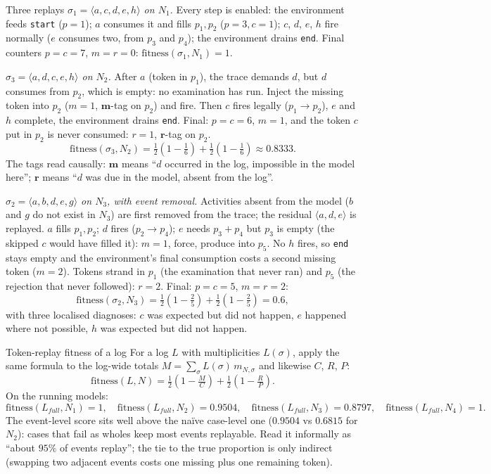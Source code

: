 \begin{examplebox}{Three replays}
\emph{$\sigma_1 = \langle a,c,d,e,h \rangle$ on $N_1$.} Every step is enabled: the environment feeds \texttt{start} ($p{=}1$); $a$ consumes it and fills $p_1, p_2$ ($p{=}3, c{=}1$); $c$, $d$, $e$, $h$ fire normally ($e$ consumes two, from $p_3$ and $p_4$); the environment drains \texttt{end}. Final counters $p = c = 7$, $m = r = 0$: $\text{fitness}(\sigma_1, N_1) = 1$.
\par\smallskip
\emph{$\sigma_3 = \langle a,d,c,e,h \rangle$ on $N_2$.} After $a$ (token in $p_1$), the trace demands $d$, but $d$ consumes from $p_2$, which is empty: no examination has run. Inject the missing token into $p_2$ ($m{=}1$, $\mathbf{m}$-tag on $p_2$) and fire. Then $c$ fires legally ($p_1 \to p_2$), $e$ and $h$ complete, the environment drains \texttt{end}. Final: $p = c = 6$, $m = 1$, and the token $c$ put in $p_2$ is never consumed: $r = 1$, $\mathbf{r}$-tag on $p_2$.
\[\text{fitness}(\sigma_3, N_2) = \tfrac{1}{2}\!\left(1 - \tfrac{1}{6}\right) + \tfrac{1}{2}\!\left(1 - \tfrac{1}{6}\right) \approx 0.8333.\]
The tags read causally: $\mathbf{m}$ means ``$d$ occurred in the log, impossible in the model here''; $\mathbf{r}$ means ``$d$ was due in the model, absent from the log''.
\par\smallskip
\emph{$\sigma_2 = \langle a,b,d,e,g \rangle$ on $N_3$, with event removal.} Activities absent from the model ($b$ and $g$ do not exist in $N_3$) are first removed from the trace; the residual $\langle a,d,e \rangle$ is replayed. $a$ fills $p_1, p_2$; $d$ fires ($p_2 \to p_4$); $e$ needs $p_3 + p_4$ but $p_3$ is empty (the skipped $c$ would have filled it): $m{=}1$, force, produce into $p_5$. No $h$ fires, so \texttt{end} stays empty and the environment's final consumption costs a second missing token ($m{=}2$). Tokens strand in $p_1$ (the examination that never ran) and $p_5$ (the rejection that never followed): $r = 2$. Final: $p = c = 5$, $m = r = 2$:
\[\text{fitness}(\sigma_2, N_3) = \tfrac{1}{2}\!\left(1 - \tfrac{2}{5}\right) + \tfrac{1}{2}\!\left(1 - \tfrac{2}{5}\right) = 0.6,\]
with three localised diagnoses: $c$ was expected but did not happen, $e$ happened where not possible, $h$ was expected but did not happen.
\end{examplebox}

\begin{definitionbox}{Token-replay fitness of a log}
For a log $L$ with multiplicities $L(\sigma)$, apply the same formula to the log-wide totals $M = \sum_{\sigma} L(\sigma)\, m_{N,\sigma}$ and likewise $C$, $R$, $P$:
\[\text{fitness}(L, N) = \tfrac{1}{2}\!\left(1 - \tfrac{M}{C}\right) + \tfrac{1}{2}\!\left(1 - \tfrac{R}{P}\right).\]
On the running models:
\[\text{fitness}(L_{full}, N_1) = 1, \quad \text{fitness}(L_{full}, N_2) = 0.9504, \quad \text{fitness}(L_{full}, N_3) = 0.8797, \quad \text{fitness}(L_{full}, N_4) = 1.\]
The event-level score sits well above the naïve case-level one ($0.9504$ vs $0.6815$ for $N_2$): cases that fail as wholes keep most events replayable. Read it informally as ``about $95\%$ of events replay''; the tie to the true proportion is only indirect (swapping two adjacent events costs one missing plus one remaining token).
\end{definitionbox}


